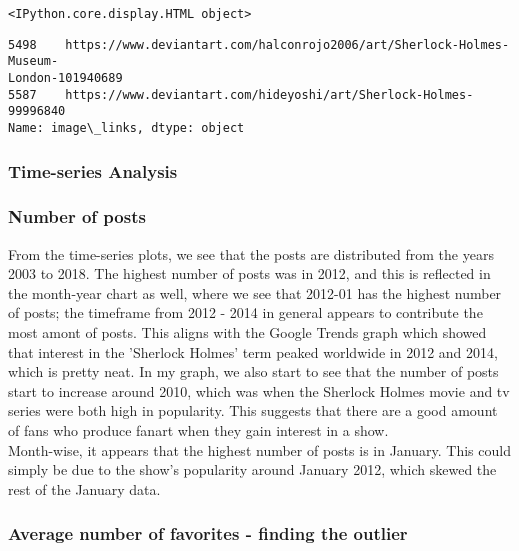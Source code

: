 \documentclass[11pt]{article}
\begin{document}
    
    \begin{verbatim}
<IPython.core.display.HTML object>
    \end{verbatim}

    
    \begin{Verbatim}[commandchars=\\\{\},fontsize=\footnotesize]
5498    https://www.deviantart.com/halconrojo2006/art/Sherlock-Holmes-Museum-
London-101940689
5587    https://www.deviantart.com/hideyoshi/art/Sherlock-Holmes-99996840
Name: image\_links, dtype: object

    \end{Verbatim}

    \begin{center}
    \end{center}

        \newpage
    \subsubsection{Time-series Analysis}

    \subsubsection*{Number of posts}

From the time-series plots, we see that the posts are distributed from
the years 2003 to 2018. The highest number of posts was in 2012, and
this is reflected in the month-year chart as well, where we see that
2012-01 has the highest number of posts; the timeframe from 2012 - 2014
in general appears to contribute the most amont of posts. This aligns
with the Google Trends graph which showed that interest in the 'Sherlock
Holmes' term peaked worldwide in 2012 and 2014, which is pretty neat. In
my graph, we also start to see that the number of posts start to
increase around 2010, which was when the Sherlock Holmes movie and tv
series were both high in popularity. This suggests that there are a good
amount of fans who produce fanart when they gain interest in a show.\\

Month-wise, it appears that the highest number of posts is in January.
This could simply be due to the show's popularity around January 2012,
which skewed the rest of the January data.

   \subsubsection*{Average number of favorites - finding the outlier}
\end{document}
